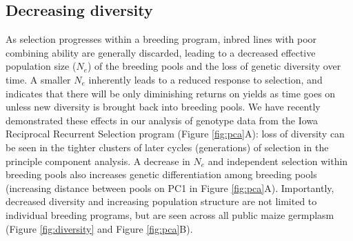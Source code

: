 \documentclass[12pt]{article}
\begin{document}
 
%
%



\subsection*{Decreasing diversity} 

As selection progresses within a breeding program, inbred lines with poor combining ability are generally discarded, leading to a decreased effective population size ($N_e$) of the breeding pools and the loss of genetic diversity over time.
A smaller $N_e$ inherently leads to a reduced response to  selection, and indicates that there will be only diminishing returns on yields as time goes on unless new diversity is brought back into breeding pools.
We have recently demonstrated these effects in our analysis of genotype data from the Iowa Reciprocal Recurrent Selection program (Figure \ref{fig:pca}A): loss of diversity can be seen in the tighter clusters of later cycles (generations) of selection in the principle component analysis.
A decrease in $N_e$ and independent selection within breeding pools also increases genetic differentiation among breeding pools (increasing distance between pools on PC1 in Figure \ref{fig:pca}A).
Importantly, decreased diversity and increasing population structure are not limited to individual breeding programs, but are seen across all public maize germplasm (Figure \ref{fig:diversity} and Figure \ref{fig:pca}B). 
\end{document}

